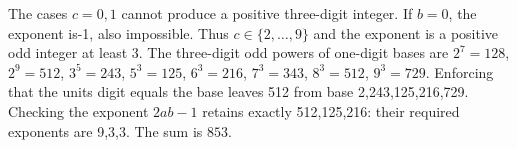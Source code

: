 The cases $c=0,1$ cannot produce a positive three-digit integer. If $b=0$, the exponent is-1, also impossible. Thus $c\in\{2,\ldots,9\}$ and the exponent is a positive odd integer at least 3. The three-digit odd powers of one-digit bases are $2^7=128$, $2^9=512$, $3^5=243$, $5^3=125$, $6^3=216$, $7^3=343$, $8^3=512$, $9^3=729$. Enforcing that the units digit equals the base leaves 512 from base 2,243,125,216,729. Checking the exponent $2ab-1$ retains exactly 512,125,216: their required exponents are 9,3,3. The sum is $\boxed{853}$.
